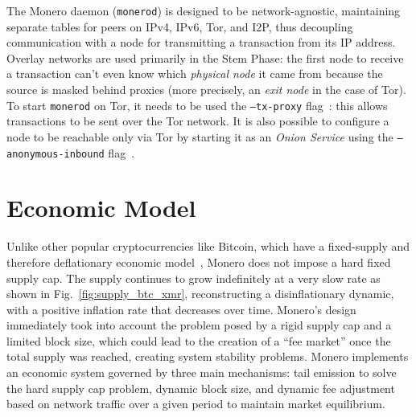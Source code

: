 \documentclass[conference]{IEEEtran}
\begin{document}
The Monero daemon (\texttt{monerod}) is designed to be network-agnostic, maintaining separate tables for peers on IPv4, IPv6, Tor, and I2P, thus decoupling communication with a node for transmitting a transaction from its IP address. Overlay networks are used primarily in the Stem Phase: the first node to receive a transaction can't even know which \textit{physical node} it came from because the source is masked behind proxies (more precisely, an \textit{exit node} in the case of Tor).\\
To start \texttt{monerod} on Tor, it needs to be used the \texttt{--tx-proxy} flag~\cite{monerod}: this allows transactions to be sent over the Tor network. It is also possible to configure a node to be reachable only via Tor by starting it as an \textit{Onion Service} using the \texttt{--anonymous-inbound} flag~\cite{monerod, advantages_of_tor_monerod}.



\section{Economic Model}
Unlike other popular cryptocurrencies like Bitcoin, which have a fixed-supply and therefore deflationary economic model~\cite{bitcoin_deflationary}, Monero does not impose a hard fixed supply cap. The supply continues to grow indefinitely at a very slow rate as shown in Fig.~\ref{fig:supply_btc_xmr}, reconstructing a disinflationary dynamic, with a positive inflation rate that decreases over time. Monero's design immediately took into account the problem posed by a rigid supply cap and a limited block size, which could lead to the creation of a ``fee market'' once the total supply was reached, creating system stability problems. Monero implements an economic system governed by three main mechanisms: tail emission to solve the hard supply cap problem, dynamic block size, and dynamic fee adjustment based on network traffic over a given period to maintain market equilibrium.
\end{document}
